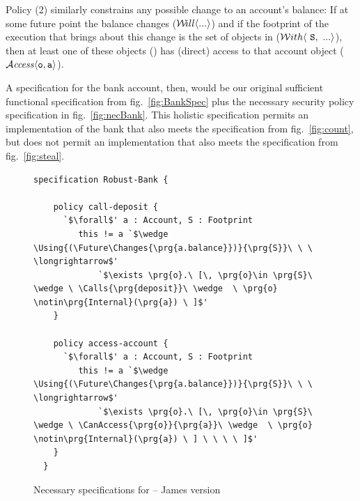 Policy (2) similarly constrains any possible change to an 
account's balance: 
If at some future point the balance changes   (${\Future{...}}$) %
and if the footprint of the
execution that brings about this change is the set of objects in  (\ie $\Using{...}{\prg{S}}$), then 
at least one of these objects () has (direct) access to that account object
($\CanAccess{\prg{o}}{\prg{a}}$).


A  specification for the bank account, then,
would be our original sufficient functional specification from
fig.~\ref{fig:BankSpec} plus the necessary security policy
specification in fig.~\ref{fig:necBank}.   
{}
This holistic specification
permits an implementation of the bank that also meets the 
specification from fig.~\ref{fig:count}, but does not permit an
implementation that also meets the  specification from
fig.~\ref{fig:steal}.

{}



\begin{figure}[tbp]
\begin{lstlisting}[escapeinside=`']
  specification Robust-Bank {

    policy call-deposit {
      `$\forall$' a : Account, S : Footprint
         this != a `$\wedge \Using{(\Future\Changes{\prg{a.balance}})}{\prg{S}}\ \ \ \longrightarrow$'
             `$\exists \prg{o}.\ [\, \prg{o}\in \prg{S}\ \wedge \ \Calls{\prg{deposit}}\ \wedge  \ \prg{o} \notin\prg{Internal}(\prg{a}) \ ]$'  
    }

    policy access-account {
      `$\forall$' a : Account, S : Footprint
         this != a `$\wedge \Using{(\Future\Changes{\prg{a.balance}})}{\prg{S}}\ \ \ \longrightarrow$'
             `$\exists \prg{o}.\ [\, \prg{o}\in \prg{S}\ \wedge \ \CanAccess{\prg{o}}{\prg{a}}\ \wedge  \ \prg{o} \notin\prg{Internal}(\prg{a}) \ ] \ \ \ \ ]$'
    }
  }
\end{lstlisting}
\caption{Necessary specifications for  -- James version}
\label{fig:kjx}
\end{figure}

